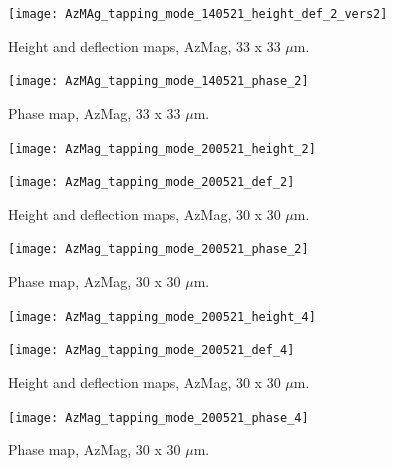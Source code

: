 \begin{figure}[H]
\centering
  \texttt{[image: AzMAg\_tapping\_mode\_140521\_height\_def\_2\_vers2]}
\caption[Height and deflection maps, AzMag]{Height and deflection maps, AzMag, 33 x 33 $\mu$m.}
\label{fig:afm_azmag_height_def_6}
\end{figure}

\begin{figure}[H]
\centering
  \texttt{[image: AzMAg\_tapping\_mode\_140521\_phase\_2]}
\caption[Phase map, AzMag]{Phase map, AzMag, 33 x 33 $\mu$m.}
\label{fig:afm_azmag_phase_6}
\end{figure}


\begin{figure}[H]
\centering
\begin{minipage}{.45\textwidth}
  \centering
  \texttt{[image: AzMag\_tapping\_mode\_200521\_height\_2]}
\end{minipage}
\begin{minipage}{.45\textwidth}
  \centering
  \texttt{[image: AzMag\_tapping\_mode\_200521\_def\_2]}
\end{minipage}
\caption[Height and deflection maps, AzMag]{Height and deflection maps, AzMag, 30 x 30 $\mu$m.}
\label{fig:afm_azmag_height_def_7}
\end{figure}

\begin{figure}[H]
\centering
  \texttt{[image: AzMag\_tapping\_mode\_200521\_phase\_2]}
\caption[Phase map, AzMag]{Phase map, AzMag, 30 x 30 $\mu$m.}
\label{fig:afm_azmag_phase_7}
\end{figure}


\begin{figure}[H]
\centering
\begin{minipage}{.45\textwidth}
  \centering
  \texttt{[image: AzMag\_tapping\_mode\_200521\_height\_4]}
\end{minipage}
\begin{minipage}{.45\textwidth}
  \centering
  \texttt{[image: AzMag\_tapping\_mode\_200521\_def\_4]}
\end{minipage}
\caption[Height and deflection maps, AzMag]{Height and deflection maps, AzMag, 30 x 30 $\mu$m.}
\label{fig:afm_azmag_height_def_8}
\end{figure}

\begin{figure}[H]
\centering
  \texttt{[image: AzMag\_tapping\_mode\_200521\_phase\_4]}
\caption[Phase map, AzMag]{Phase map, AzMag, 30 x 30 $\mu$m.}
\label{fig:afm_azmag_phase_8}
\end{figure}

